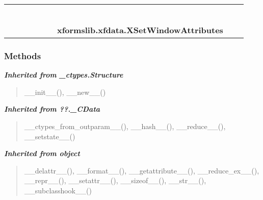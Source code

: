     \label{xformslib:xfdata:XSetWindowAttributes}
\begin{tabular}{cccccccccc}
\multicolumn{2}{r}{\settowidth{\BCL}{object}\multirow{2}{\BCL}{object}}
&&
&&
&&
  \\\cline{3-3}
  &&\multicolumn{1}{c|}{}
&&
&&
&&
  \\
\multicolumn{4}{r}{\settowidth{\BCL}{??.\_CData}\multirow{2}{\BCL}{??.\_CData}}
&&
&&
  \\\cline{5-5}
  &&&&\multicolumn{1}{c|}{}
&&
&&
  \\
\multicolumn{6}{r}{\settowidth{\BCL}{\_ctypes.Structure}\multirow{2}{\BCL}{\_ctypes.Structure}}
&&
  \\\cline{7-7}
  &&&&&&\multicolumn{1}{c|}{}
&&
  \\
&&&&&&\multicolumn{2}{l}{\textbf{xformslib.xfdata.XSetWindowAttributes}}
\end{tabular}



  \subsubsection{Methods}


\large{\textbf{\textit{Inherited from \_ctypes.Structure}}}

\begin{quote}
\_\_init\_\_(), \_\_new\_\_()
\end{quote}

\large{\textbf{\textit{Inherited from ??.\_CData}}}

\begin{quote}
\_\_ctypes\_from\_outparam\_\_(), \_\_hash\_\_(), \_\_reduce\_\_(), \_\_setstate\_\_()
\end{quote}

\large{\textbf{\textit{Inherited from object}}}

\begin{quote}
\_\_delattr\_\_(), \_\_format\_\_(), \_\_getattribute\_\_(), \_\_reduce\_ex\_\_(), \_\_repr\_\_(), \_\_setattr\_\_(), \_\_sizeof\_\_(), \_\_str\_\_(), \_\_subclasshook\_\_()
\end{quote}

